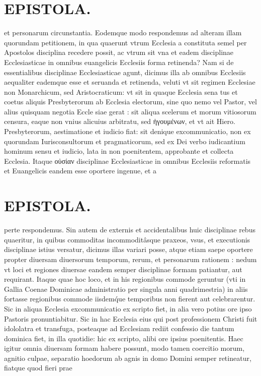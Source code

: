 \documentclass{article}
\begin{document}
\begin{pages}
\section*{EPISTOLA. }\pstart et personarum circunstantia. Eodemque modo respondemus ad alteram illam quorundam petitionem, in qua quaerunt vtrum Ecclesia a constituta semel per Apostolos disciplina recedere possit, ac vtrum sit vna et eadem disciplinae Ecclesiasticae in omnibus euangelicis Ecclesiis forma retinenda? Nam si de essentialibus disciplinae Ecclesiasticae agunt, dicimus illa ab omnibus Ecclesiis aequaliter eademque esse et seruanda et retinenda, veluti vt sit regimen Ecclesiae non Monarchicum, sed Aristocraticum: vt sit in quaque Ecclesia sena tus et coetus aliquis Presbyterorum ab Ecclesia electorum, sine quo nemo vel Pastor, vel alius quisquam negotia Eccle siae gerat : sit aliqua scelerum et morum vitiosorum censura, eaque non vnius alicuius arbitratu, sed ἡγουμένων, et vt ait Hiero. Presbyterorum, aestimatione et iudicio fiat: sit denique excommunicatio, non ex quorundam Iurisconsultorum et pragmaticorum, sed ex Dei verbo iudicantium hominum sensu et iudicio, lata in non poenitentem, approbante et collecta Ecclesia. Itaque οὐσίαν disciplinae Ecclesiasticae in omnibus Ecclesiis reformatis et Euangelicis eandem esse oportere ingenue, et a\pend
\section*{EPISTOLA. }\pstart perte respondemus. Sin autem de externis et accidentalibus huic disciplinae rebus quaeritur, in quibus commoditas incommoditâsque praxeos, vsus, et executionis disciplinae istius versatur, dicimus illas variari posse, atque etiam saepe oportere propter diuersam diuersorum temporum, rerum, et personarum rationem : nedum vt loci et regiones diuersae eandem semper disciplinae formam patiantur, aut requirant. Itaque quae hoc loco, et in his regionibus commode geruntur (vti in Gallia Coenae Dominicae administratio per singula anni quadrimestria) in aliis fortasse regionibus commode iisdemq́ue temporibus non fierent aut celebrarentur. Sic in aliqua Ecclesia excommunicatio ex scripto fiet, in alia vero potius ore ipso Pastoris pronuntiabitur. Sic in hac Ecclesia eius qui post professionem Christi fuit idololatra et transfuga, posteaque ad Ecclesiam rediit confessio die tantum dominica fiet, in illa quotidie: hic ex scripto, alibi ore ipsius poenitentis. Haec igitur omnia diuersam formam habere possunt, modo tamen coercitio morum, agnitio culpae, separatio hoedorum ab agnis in domo Domini semper retineatur, fiatque quod fieri prae\pend

\end{pages}
\end{document}
